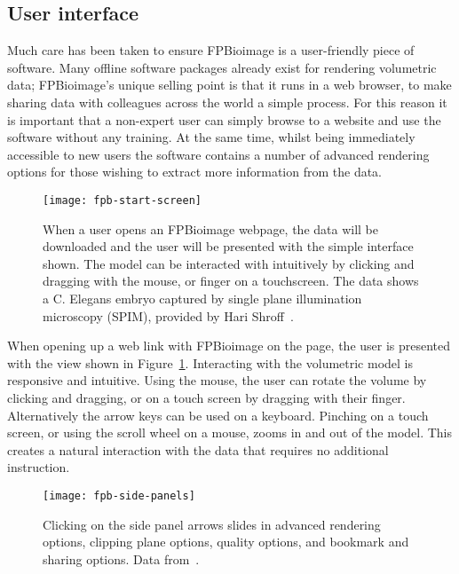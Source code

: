 \subsection{User interface}
Much care has been taken to ensure FPBioimage is a user-friendly piece of software.
Many offline software packages already exist for rendering volumetric data; FPBioimage's unique selling point is that it runs in a web browser, to make sharing data with colleagues across the world a simple process.
For this reason it is important that a non-expert user can simply browse to a website and use the software without any training.
At the same time, whilst being immediately accessible to new users the software contains a number of advanced rendering options for those wishing to extract more information from the data.

\begin{figure}[htbp!]
\centering
\texttt{[image: fpb-start-screen]}
\caption[FPBioimage: Users are presented with a simple interface which is intuitive to use]{When a user opens an FPBioimage webpage, the data will be downloaded and the user will be presented with the simple interface shown. The model can be interacted with intuitively by clicking and dragging with the mouse, or finger on a touchscreen. The data shows a C. Elegans embryo captured by single plane illumination microscopy (SPIM), provided by Hari Shroff~\cite{kumar2014dual}. }
\label{fig:FPBhome}
\end{figure}

When opening up a web link with FPBioimage on the page, the user is presented with the view shown in Figure~\ref{fig:FPBhome}.
Interacting with the volumetric model is responsive and intuitive.
Using the mouse, the user can rotate the volume by clicking and dragging, or on a touch screen by dragging with their finger.
Alternatively the arrow keys can be used on a keyboard.
Pinching on a touch screen, or using the scroll wheel on a mouse, zooms in and out of the model.
This creates a natural interaction with the data that requires no additional instruction.

\begin{figure}[htbp!]
\centering
\texttt{[image: fpb-side-panels]}
\caption[FPBioimage: Side panels provide more advanced rendering options]{Clicking on the side panel arrows slides in advanced rendering options, clipping plane options, quality options, and bookmark and sharing options. Data from~\cite{kumar2014dual}. } %
\label{fig:FPBpanels}
\end{figure}

